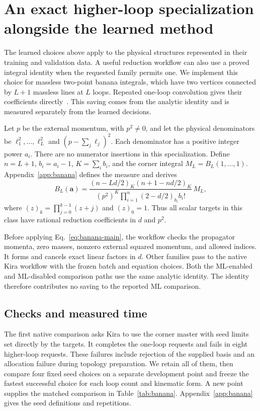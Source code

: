 \section{An exact higher-loop specialization alongside the learned method}
\label{sec:banana}
The learned choices above apply to the physical structures represented in their training and validation data. A useful reduction workflow can also use a proved integral identity when the requested family permits one. We implement this choice for massless two-point banana integrals, which have two vertices connected by $L+1$ massless lines at $L$ loops. Repeated one-loop convolution gives their coefficients directly~\cite{Grozin2004Banana}. This saving comes from the analytic identity and is measured separately from the learned decisions.

Let $p$ be the external momentum, with $p^2\ne0$, and let the physical denominators be $\ell_1^2,\ldots,\ell_L^2$ and $(p-\sum_j\ell_j)^2$. Each denominator has a positive integer power $a_i$. There are no numerator insertions in this specialization. Define $n=L+1$, $b_i=a_i-1$, $K=\sum_i b_i$, and the corner integral $M_L=B_L(1,\ldots,1)$. Appendix~\ref{app:banana} defines the measure and derives
\begin{equation}
 B_L(\boldsymbol a)=
 \frac{(n-Ld/2)_K(n+1-nd/2)_K}
 {(p^2)^K\prod_{i=1}^{n}(2-d/2)_{b_i}b_i!}\,M_L,
 \label{eq:banana-main}
\end{equation}
where $(z)_k=\prod_{j=0}^{k-1}(z+j)$ and $(z)_0=1$. Thus all scalar targets in this class have rational reduction coefficients in $d$ and $p^2$.

Before applying Eq.~\eqref{eq:banana-main}, the workflow checks the propagator momenta, zero masses, nonzero external squared momentum, and allowed indices. It forms and cancels exact linear factors in $d$. Other families pass to the native Kira workflow with the frozen batch and equation choices. Both the ML-enabled and ML-disabled comparison paths use the same analytic identity. The identity therefore contributes no saving to the reported ML comparison.

\subsection{Checks and measured time}
The first native comparison asks Kira to use the corner master with seed limits set directly by the targets. It completes the one-loop requests and fails in eight higher-loop requests. These failures include rejection of the supplied basis and an allocation failure during topology preparation. We retain all of them, then compare four fixed seed choices on a separate development point and freeze the fastest successful choice for each loop count and kinematic form. A new point supplies the matched comparison in Table~\ref{tab:banana}. Appendix~\ref{app:banana} gives the seed definitions and repetitions.


